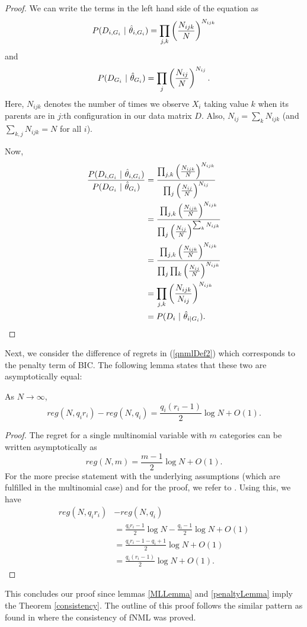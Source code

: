 \begin{proof}
We can write the terms in the left hand side of the equation as
$$
P(D_{i, G_i} \ | \ \hat{\theta}_{i, G_i}) = \prod_{j,k} \Le \frac{N_{ijk}}{N}  \Ri^{N_{ijk}}
$$and
$$
P(D_{G_i} \ | \ \hat{\theta}_{G_i} ) =  \prod_{j} \left( \frac{N_{ij}}{N}  \right)^{N_{ij}}.
$$Here, $N_{ijk}$ denotes the number of times we observe $X_i$ taking value $k$ when its parents are in $j$:th configuration in our data matrix $D$. Also, $N_{ij} = \sum_k N_{ijk}$ (and $\sum_{k,j}N_{ijk} = N$ for all $i$).

Now,
\begin{align*}
\frac{P(D_{i, G_i} \ | \ \hat{\theta}_{i, G_i} )}{P(D_{G_i} \ | \ \hat{\theta}_{G_i} )} &= \frac{ \prod_{j,k} \Le \frac{N_{ijk}}{N}  \Ri^{N_{ijk}}}{\prod_{j} \Le \frac{N_{ij}}{N}  \Ri^{N_{ij}}} \\
&= \frac{ \prod_{j,k} \Le \frac{N_{ijk}}{N}  \Ri^{N_{ijk}}}{\prod_{j} \Le \frac{N_{ij}}{N}  \Ri^{\sum_k N_{ijk}}} \\
&= \frac{ \prod_{j,k} \Le \frac{N_{ijk}}{N}  \Ri^{N_{ijk}}}{\prod_{j}\prod_{k} \Le \frac{N_{ij}}{N}  \Ri^{N_{ijk}}}\\
&= \prod_{j,k} \Le \frac{N_{ijk}}{N_{ij}} \Ri^{N_{ijk}} \\
&= P(D_i \ | \ \hat{\theta}_{i | G_i} ).
\end{align*} 

\end{proof}

Next, we consider the difference of regrets in
(\ref{qnmlDef2}) which corresponds to the penalty term of BIC. The
following lemma states that these two are asymptotically equal:

\begin{lemma}\label{penaltyLemma}
As $N \to \infty$,
$$reg(N,q_i r_i) - reg(N,q_i) = \frac{q_i(r_i - 1)}{2}\log N + O(1).$$   
\end{lemma}
\begin{proof}
The regret
for a single multinomial variable with $m$ categories can be written
asymptotically as
\begin{equation}\label{regretAsymp}
reg(N,m) = \frac{m-1}{2}\log N + O(1).
\end{equation}
For the more precise statement with the underlying assumptions (which are fulfilled in the multinomial case) and for the proof, we refer to \cite{Riss96a, Grun07}. Using this, we have
\begin{align*}
reg(N,q_i r_i)& -  reg(N,q_i) \\ 
&= \frac{q_ir_i-1}{2}\log N-\frac{q_i-1}{2}\log N + O(1) \\
&= \frac{q_ir_i-1-q_i + 1}{2}\log N + O(1) \\
&= \frac{q_i(r_i - 1)}{2} \log N + O(1).
\end{align*}
\end{proof}
This concludes our proof since lemmas \ref{MLLemma} and \ref{penaltyLemma} imply the Theorem \ref{consistency}. The outline of this proof follows the
similar pattern as found in \cite{SilanderIJAR10} where the
consistency of fNML was proved.

